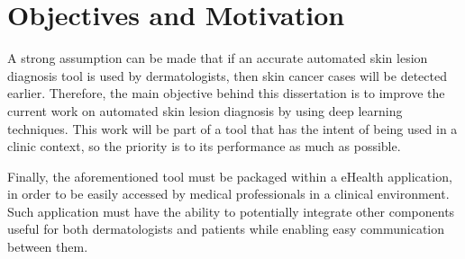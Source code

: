 \section{Objectives and Motivation}
A strong assumption can be made that if an accurate automated skin lesion diagnosis tool is used by dermatologists, then skin cancer cases will be detected earlier. Therefore, the main objective behind this dissertation is to improve the current work on automated skin lesion diagnosis by using deep learning techniques. This work will be part of a tool that has the intent of being used in a clinic context, so the priority is to its performance as much as possible. \par 
Finally, the aforementioned tool must be packaged within a eHealth application, in order to be easily accessed by medical professionals in a clinical environment. Such application must have the ability to potentially integrate other components useful for both dermatologists and patients while enabling easy communication between them. 

